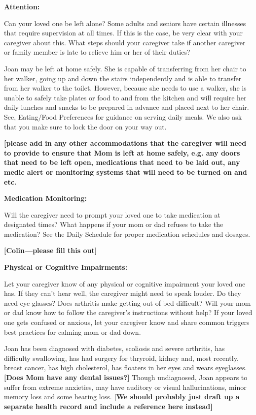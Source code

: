 \documentclass[]{article}
\begin{document}
\textbf{Attention:}

Can your loved one be left alone? Some adults and seniors have certain
illnesses that require supervision at all times. If this is the case, be
very clear with your caregiver about this. What steps should your
caregiver take if another caregiver or family member is late to relieve
him or her of their duties?

Joan may be left at home safely. She is capable of transferring from her
chair to her walker, going up and down the stairs independently and is
able to transfer from her walker to the toilet. However, because she
needs to use a walker, she is unable to safely take plates or food to
and from the kitchen and will require her daily lunches and snacks to be
prepared in advance and placed next to her chair. See, Eating/Food
Preferences for guidance on serving daily meals. We also ask that you
make sure to lock the door on your way out.

\textbf{{[}please add in any other accommodations that the caregiver
will need to provide to ensure that Mom is left at home safely, e.g. any
doors that need to be left open, medications that need to be laid out,
any medic alert or monitoring systems that will need to be turned on and
etc. }

\textbf{Medication Monitoring:}

Will the caregiver need to prompt your loved one to take medication at
designated times? What happens if your mom or dad refuses to take the
medication? See the Daily Schedule for proper medication schedules and
dosages.

\textbf{{[}Colin---please fill this out{]}}

\textbf{Physical or Cognitive Impairments:}

Let your caregiver know of any physical or cognitive impairment your
loved one has. If they can't hear well, the caregiver might need to
speak louder. Do they need eye glasses? Does arthritis make getting out
of bed difficult? Will your mom or dad know how to follow the
caregiver's instructions without help? If your loved one gets confused
or anxious, let your caregiver know and share common triggers best
practices for calming mom or dad down.

Joan has been diagnosed with diabetes, scoliosis and severe arthritis,
has difficulty swallowing, has had surgery for thryroid, kidney and,
most recently, breast cancer, has high cholesterol, has floaters in her
eyes and wears eyeglasses. \textbf{{[}Does Mom have any dental
issues?{]}} Though undiagnosed, Joan appears to suffer from extreme
anxieties, may have auditory or visual hallucinations, minor memory loss
and some hearing loss. \textbf{{[}We should probably just draft up a
separate health record and include a reference here instead{]}}
\end{document}
